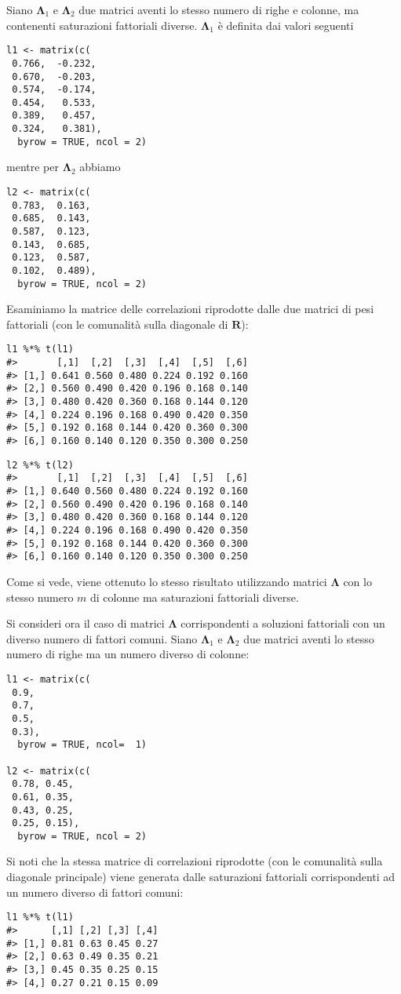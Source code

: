 \begin{exmp} 
Siano $\boldsymbol{\Lambda}_1$ e $\boldsymbol{\Lambda}_2$ due
matrici  aventi lo stesso numero di righe e colonne, ma contenenti saturazioni fattoriali diverse.  $\boldsymbol{\Lambda}_1$ è definita dai valori seguenti
\begin{lstlisting}
l1 <- matrix(c(
 0.766,  -0.232,
 0.670,  -0.203,
 0.574,  -0.174,
 0.454,   0.533,
 0.389,   0.457,
 0.324,   0.381),
  byrow = TRUE, ncol = 2)
\end{lstlisting}
mentre per $\boldsymbol{\Lambda}_2$  abbiamo
\medskip
\begin{lstlisting}
l2 <- matrix(c(
 0.783,  0.163,
 0.685,  0.143,
 0.587,  0.123,
 0.143,  0.685,
 0.123,  0.587,
 0.102,  0.489),
  byrow = TRUE, ncol = 2)
\end{lstlisting}
Esaminiamo la matrice delle correlazioni riprodotte dalle due matrici di pesi fattoriali (con le comunalit{\`a} sulla diagonale di $\boldsymbol{R}$):
\begin{lstlisting}
l1 %*% t(l1)
#>       [,1]  [,2]  [,3]  [,4]  [,5]  [,6]
#> [1,] 0.641 0.560 0.480 0.224 0.192 0.160
#> [2,] 0.560 0.490 0.420 0.196 0.168 0.140
#> [3,] 0.480 0.420 0.360 0.168 0.144 0.120
#> [4,] 0.224 0.196 0.168 0.490 0.420 0.350
#> [5,] 0.192 0.168 0.144 0.420 0.360 0.300
#> [6,] 0.160 0.140 0.120 0.350 0.300 0.250
\end{lstlisting}
\begin{lstlisting}
l2 %*% t(l2)
#>       [,1]  [,2]  [,3]  [,4]  [,5]  [,6]
#> [1,] 0.640 0.560 0.480 0.224 0.192 0.160
#> [2,] 0.560 0.490 0.420 0.196 0.168 0.140
#> [3,] 0.480 0.420 0.360 0.168 0.144 0.120
#> [4,] 0.224 0.196 0.168 0.490 0.420 0.350
#> [5,] 0.192 0.168 0.144 0.420 0.360 0.300
#> [6,] 0.160 0.140 0.120 0.350 0.300 0.250
\end{lstlisting}
Come si vede, viene ottenuto lo stesso risultato utilizzando matrici $\boldsymbol{\Lambda}$ con lo stesso numero $m$ di colonne ma saturazioni
fattoriali diverse.  

Si consideri ora il caso di matrici $\boldsymbol{\Lambda}$ corrispondenti a soluzioni fattoriali con un diverso numero di fattori comuni. Siano $\boldsymbol{\Lambda}_1$ e
$\boldsymbol{\Lambda}_2$ due matrici aventi lo stesso numero di righe ma un  numero diverso di colonne:
\begin{lstlisting}
l1 <- matrix(c(
 0.9,
 0.7,
 0.5,
 0.3),
  byrow = TRUE, ncol=  1)

l2 <- matrix(c(
 0.78, 0.45,
 0.61, 0.35,
 0.43, 0.25,
 0.25, 0.15),
  byrow = TRUE, ncol = 2)
\end{lstlisting}
Si noti che la stessa matrice di 
correlazioni riprodotte (con le comunalit{\`a} sulla diagonale principale) viene generata dalle saturazioni fattoriali corrispondenti ad un numero diverso di fattori comuni:
\begin{lstlisting}
l1 %*% t(l1)
#>      [,1] [,2] [,3] [,4]
#> [1,] 0.81 0.63 0.45 0.27
#> [2,] 0.63 0.49 0.35 0.21
#> [3,] 0.45 0.35 0.25 0.15
#> [4,] 0.27 0.21 0.15 0.09


\end{lstlisting}
\end{exmp}
